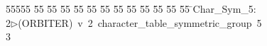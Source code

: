 %
%
\begin{tabbing}
55555 \= 55 \= 55 \= 55 \= 55 \= 55 \= 55 \= 55 \= 55 \= 55 \= 55 \= 55 \= 55 \= \>Char\_Sym\_5:\\[0pt]
2\>$\triangleright$\>(ORBITER)\ v\ 2\ character\_table\_symmetric\_group\ 5\\[0pt]
3\>\end{tabbing}
